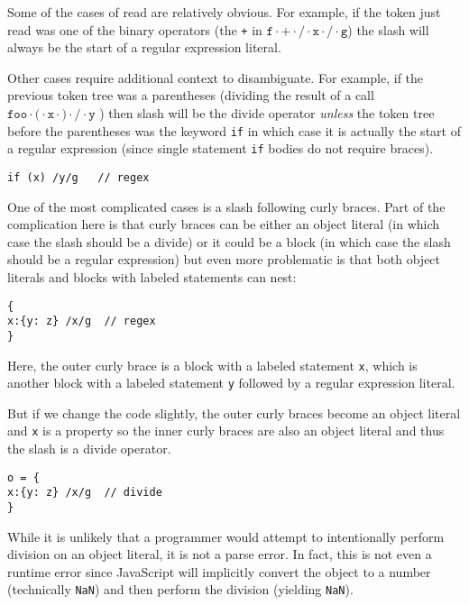 \documentclass[preprint,10pt]{sigplanconf}
\begin{document}
Some of the cases of read are relatively obvious. For example, if the
token just read was one of the binary operators (\eg the \texttt{+} in
\(\texttt{f} \cdot \texttt{+} \cdot \texttt{/} 
\cdot \texttt{x} \cdot \texttt{/} \cdot \texttt{g}
\)) the slash will always be the start of a regular expression
literal. 

Other cases require additional context to disambiguate. For example,
if the previous token tree was a parentheses (\eg dividing the result
of a call 
\(
\texttt{foo} \cdot \texttt{(} \cdot \texttt{x} \cdot \texttt{)} \cdot \texttt{/} \cdot \texttt{y}
\)
) then slash will be the divide
operator \emph{unless} the token tree before the parentheses was the
keyword \texttt{if} in which case it is actually the start of a
regular expression (since single statement \texttt{if} bodies do not require
braces).

\begin{lstlisting}
if (x) /y/g   // regex
\end{lstlisting}

One of the most complicated cases is a slash following curly braces.
Part of the  complication here is that curly braces can be either an object
literal (in which case the slash should be a divide) or it could be a
block (in which case the slash should be a regular expression) but
even more problematic is that both object literals and blocks with
labeled statements can nest:

\begin{lstlisting}
{
x:{y: z} /x/g  // regex
}
\end{lstlisting}

Here, the outer curly brace is a block with a labeled statement
\verb!x!, which is another block with a labeled statement
\verb!y! followed by a regular expression literal.

But if we change the code slightly, the outer curly braces become an
object literal and \verb!x! is a property so the inner curly
braces are also an object literal and thus the slash is a divide operator.

\begin{lstlisting}
o = {
x:{y: z} /x/g  // divide
}
\end{lstlisting}

While it is unlikely that a programmer would attempt to intentionally
perform division on an object literal, it is not a parse error. In
fact, this is not even a runtime error since JavaScript will
implicitly convert the object to a number (technically
\verb!NaN!) and then perform the division (yielding
\verb!NaN!).
\end{document}
